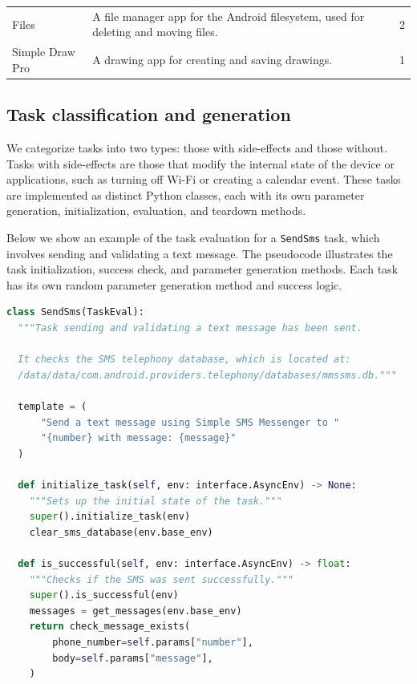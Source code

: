 \documentclass{article}
\begin{document}
\begin{appendices}
\begin{table}
{\begin{tabular}{lp{10cm}c}
    Files & A file manager app for the Android filesystem, used for deleting and moving files. & 2 \\
  
    Simple Draw Pro & A drawing app for creating and saving drawings. & 1 \\
    \bottomrule
    \end{tabular}
}
\label{table:app-list}
\end{table}

\subsection{Task classification and generation}
\label{sec:task_definition}

We categorize tasks into two types: those with side-effects and those without. Tasks with side-effects are those that modify the internal state of the device or applications, such as turning off Wi-Fi or creating a calendar event. These tasks are implemented as distinct Python classes, each with its own parameter generation, initialization, evaluation, and teardown methods. 

Below we show an example of the task evaluation for a \texttt{SendSms} task, which involves sending and validating a text message. The pseudocode illustrates the task initialization, success check, and parameter generation methods. Each task has its own random parameter generation method and success logic.

\begin{lstlisting}[language=Python, basicstyle=\ttfamily\footnotesize, style=mystyle]
class SendSms(TaskEval):
  """Task sending and validating a text message has been sent.

  It checks the SMS telephony database, which is located at:
  /data/data/com.android.providers.telephony/databases/mmssms.db."""

  template = (
      "Send a text message using Simple SMS Messenger to "
      "{number} with message: {message}"
  )

  def initialize_task(self, env: interface.AsyncEnv) -> None:
    """Sets up the initial state of the task."""
    super().initialize_task(env)
    clear_sms_database(env.base_env)

  def is_successful(self, env: interface.AsyncEnv) -> float:
    """Checks if the SMS was sent successfully."""
    super().is_successful(env)
    messages = get_messages(env.base_env)
    return check_message_exists(
        phone_number=self.params["number"],
        body=self.params["message"],
    )


\end{lstlisting}
\end{appendices}
\end{document}
